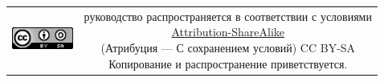 \begin{table}[ht]
  \begin{tabular}{cc}
    \includegraphics[width=2cm]{CC_BY-SA_88x31.png} &
    \shortstack{руководство распространяется в соответствии с
      условиями\\
      \href{http://creativecommons.org/licenses/by-sa/3.0/}{Attribution-ShareAlike} \\
      (Атрибуция — С сохранением условий) CC BY-SA \\
      Копирование и распространение приветствуется.}
  \end{tabular}







\end{table}







